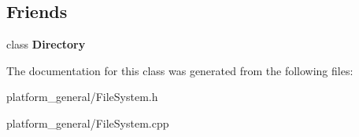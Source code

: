 \subsection*{\-Friends}
\begin{DoxyCompactItemize}
\item 
\hypertarget{classgeneral__server_1_1ResourcesStore_a245303e8660be5fb8eb2828a8c44b773}{class {\bfseries \-Directory}}\label{classgeneral__server_1_1ResourcesStore_a245303e8660be5fb8eb2828a8c44b773}

\end{DoxyCompactItemize}


\-The documentation for this class was generated from the following files\-:\begin{DoxyCompactItemize}
\item 
platform\-\_\-general/\-File\-System.\-h\item 
platform\-\_\-general/\-File\-System.\-cpp\end{DoxyCompactItemize}

